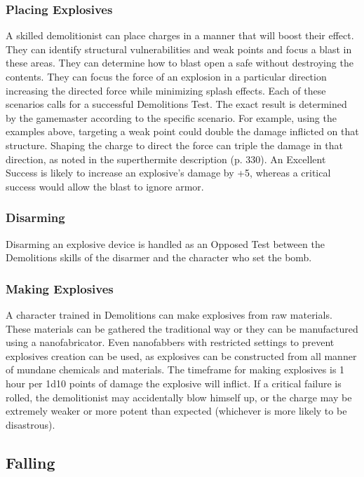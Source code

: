 \subsubsection{Placing Explosives}

A skilled demolitionist can place charges in a manner 
that will boost their effect. They can identify structural
vulnerabilities and weak points and focus a
blast in these areas. They can determine how to blast 
open a safe without destroying the contents. They can 
focus the force of an explosion in a particular direction
increasing the directed force while minimizing
splash effects.
Each of these scenarios calls for a successful Demolitions
Test. The exact result is determined by
the gamemaster according to the specific  scenario. 
For example, using the examples above, targeting 
a weak point could double the damage inflicted on 
that structure. Shaping the charge to direct the force 
can triple the damage in that direction, as noted in 
the superthermite description (p. 330). An Excellent 
Success is likely to increase an explosive's damage by 
+5, whereas a critical success would allow the blast to 
ignore armor.

\subsubsection{Disarming}

Disarming an explosive device is handled as an Opposed
Test between the Demolitions skills of the disarmer
and the character who set the bomb.

\subsubsection{Making Explosives}

A character trained in Demolitions can make explosives
from raw materials. These materials can be
gathered the traditional way or they can be manufactured
using a nanofabricator. Even nanofabbers with
restricted settings to prevent explosives creation can 
be used, as explosives can be constructed from all 
manner of mundane chemicals and materials.
The timeframe for making explosives is 1 hour per 
1d10 points of damage the explosive will inflict. If a 
critical failure is rolled, the demolitionist may accidentally
blow himself up, or the charge may be extremely
weaker or more potent than expected (whichever is 
more likely to be disastrous).

\subsection{Falling}

